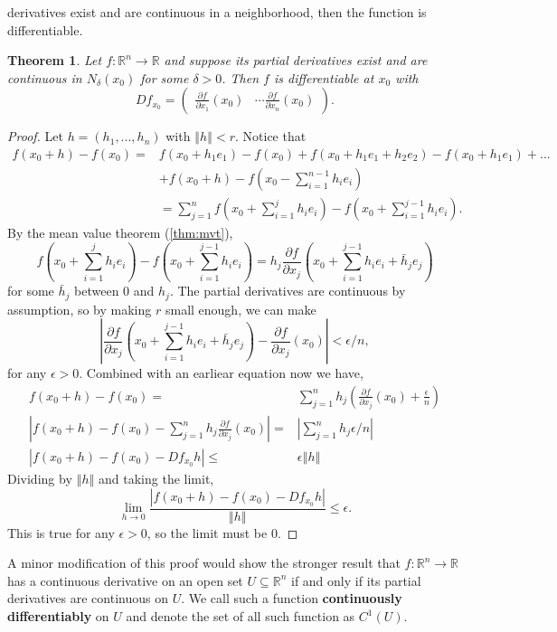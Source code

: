 \documentclass[12pt,reqno]{amsart}
\newtheorem{theorem}{Theorem}[section]
\theoremstyle{definition}
\def\R{\mathbb{R}}
\newcommand{\norm}[1]{\left\Vert {#1} \right\Vert}
\renewcommand{\to}{{\rightarrow}}
\begin{document}
derivatives exist and are continuous in a neighborhood, then the
function is differentiable. 
\begin{theorem}\label{thm:ptdiff}
  Let $f:\R^n \to \R$ and suppose its partial derivatives exist and
  are continuous in $N_\delta(x_0)$ for some $\delta>0$. Then $f$
  is differentiable at $x_0$ with 
  \[ Df_{x_0}= \begin{pmatrix} \frac{ \partial f}{\partial x_1}(x_0) &
    \cdots \frac{ \partial f}{\partial x_n }(x_0)
  \end{pmatrix}. \]
\end{theorem}
\begin{proof}
  Let $h = (h_1, ..., h_n)$ with $\norm{h}<r$. Notice that
  \begin{align} 
    f(x_0+h) - f(x_0) = & f(x_0 + h_1 e_1) - f(x_0) + f(x_0+h_1 e_1 +
    h_2 e_2) - f(x_0 + h_1 e_1) + ... \\
    & + f(x_0 + h) - f\left(x_0 -
    \sum_{i=1}^{n-1} h_i e_i\right) \\
    &  = \sum_{j=1}^n f\left(x_0 + \sum_{i=1}^j h_i e_i\right) -
    f\left(x_0 + \sum_{i=1}^{j-1} h_i e_i\right).
  \end{align}
  By the mean value theorem (\ref{thm:mvt}), 
  \[ f\left(x_0 + \sum_{i=1}^j h_i e_i\right) -
  f\left(x_0 + \sum_{i=1}^{j-1} h_i e_i\right) = h_j \frac{\partial f}
  {\partial x_j} (x_0 +  \sum_{i=1}^{j-1} h_i e_i + \bar{h}_je_j) \]
  for some $\bar{h}_j$ between $0$ and $h_j$.  The partial derivatives
  are continuous by assumption, so by making $r$ small enough, we can
  make  
  \[\left| \frac{\partial f}
    {\partial x_j} (x_0 +  \sum_{i=1}^{j-1} h_i e_i + \bar{h}_je_j) -
    \frac{\partial f}{\partial x_j}(x_0) \right| < \epsilon /n, \]
  for any $\epsilon>0$. 
  Combined with an earliear equation now we have,
  \begin{align} 
    f(x_0+h) - f(x_0) = & \sum_{j=1}^n  h_j \left(\frac{\partial f}{\partial
        x_j} (x_0) + \frac{\epsilon}{n}\right) \\
    \left| f(x_0+h) - f(x_0)  - \sum_{j=1}^n  h_j \frac{\partial f}{\partial
        x_j} (x_0) \right| = & \left| \sum_{j=1}^n h_j \epsilon/n \right|
    \\
    \left| f(x_0+h) - f(x_0)  - Df_{x_0} h \right| \leq & \epsilon
    \norm{h} 
  \end{align}
  Dividing by $\norm{h}$ and taking the limit, 
  \[ \lim_{h \to 0} \frac{\left| f(x_0+h) - f(x_0)  - Df_{x_0} h
    \right|}{\norm{h}} \leq \epsilon.
  \]
  This is true for any $\epsilon>0$, so the limit must be 0. 
\end{proof}
A minor modification of this proof would show the stronger result that
$f:\R^n \to \R$ has a continuous derivative on an open set $U
\subseteq \R^n$ if and only if its partial derivatives are continuous
on $U$. We call such a function \textbf{continuously differentiably}
on $U$ and denote the set of all such function as $C^1(U)$. 
\end{document}

